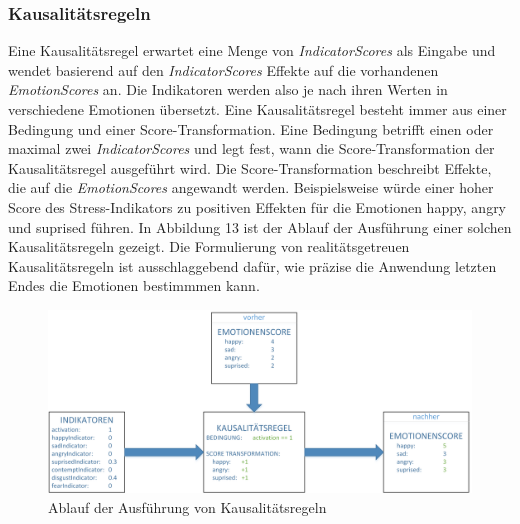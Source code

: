 \subsubsection{Kausalitätsregeln}
Eine Kausalitätsregel erwartet eine Menge von \textit{IndicatorScores} als Eingabe und wendet basierend auf den \textit{IndicatorScores} Effekte auf die vorhandenen \textit{EmotionScores} an. Die Indikatoren werden also je nach ihren Werten in verschiedene Emotionen übersetzt. \newline Eine Kausalitätsregel besteht immer aus einer Bedingung und einer Score-Transformation. Eine Bedingung betrifft einen oder maximal zwei \textit{IndicatorScores} und legt fest, wann die Score-Transformation der Kausalitätsregel ausgeführt wird. Die Score-Transformation beschreibt Effekte, die auf die \textit{EmotionScores} angewandt werden. Beispielsweise würde einer hoher Score des Stress-Indikators zu positiven Effekten für die Emotionen happy, angry und suprised führen. In Abbildung 13 ist der Ablauf der Ausführung einer solchen Kausalitätsregeln gezeigt. Die Formulierung von realitätsgetreuen Kausalitätsregeln ist ausschlaggebend dafür, wie präzise die Anwendung letzten Endes die Emotionen bestimmmen kann. \newline
\begin{figure}[h]
	\centering
	\includegraphics[width=16cm]{Bilder/causalityrules.png}
	\caption[Ablauf der Ausführung von Kausalitätsregeln]{Ablauf der Ausführung von Kausalitätsregeln}
\end{figure}%
